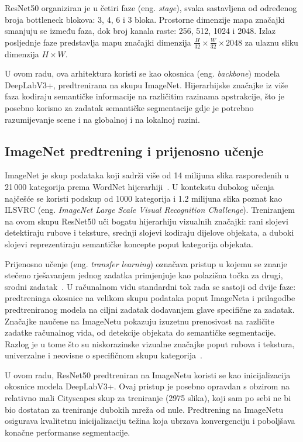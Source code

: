 \documentclass[diplomskirad]{fer}
\begin{document}
ResNet50 organiziran je u četiri faze (eng. \textit{stage}), svaka sastavljena od određenog broja bottleneck blokova: 3, 4, 6 i 3 bloka. Prostorne dimenzije mapa značajki smanjuju se između faza, dok broj kanala raste: 256, 512, 1024 i 2048. Izlaz posljednje faze predstavlja mapu značajki dimenzija $\frac{H}{32} \times \frac{W}{32} \times 2048$ za ulaznu sliku dimenzija $H \times W$.

U ovom radu, ova arhitektura koristi se kao okosnica (eng. \textit{backbone}) modela DeepLabV3+, predtrenirana na skupu ImageNet. Hijerarhijske značajke iz više faza kodiraju semantičke informacije na različitim razinama apstrakcije, što je posebno korisno za zadatak semantičke segmentacije gdje je potrebno razumijevanje scene i na globalnoj i na lokalnoj razini.

\subsection{ImageNet predtrening i prijenosno učenje}
\label{sec:transfer_learning}

ImageNet je skup podataka koji sadrži više od 14 milijuna slika raspoređenih u 21\,000 kategorija prema WordNet hijerarhiji~\cite{deng2009imagenet}. U kontekstu dubokog učenja najčešće se koristi podskup od 1000 kategorija i 1.2 milijuna slika poznat kao ILSVRC (eng. \textit{ImageNet Large Scale Visual Recognition Challenge}). Treniranjem na ovom skupu ResNet50 uči bogatu hijerarhiju vizualnih značajki: rani slojevi detektiraju rubove i teksture, srednji slojevi kodiraju dijelove objekata, a duboki slojevi reprezentiraju semantičke koncepte poput kategorija objekata.

Prijenosno učenje (eng. \textit{transfer learning}) označava pristup u kojemu se znanje stečeno rješavanjem jednog zadatka primjenjuje kao polazišna točka za drugi, srodni zadatak~\cite{goodfellow2016deep}. U računalnom vidu standardni tok rada se sastoji od dvije faze: predtreninga okosnice na velikom skupu podataka poput ImageNeta i prilagodbe predtreniranog modela na ciljni zadatak dodavanjem glave specifične za zadatak. Značajke naučene na ImageNetu pokazuju izuzetnu prenosivost na različite zadatke računalnog vida, od detekcije objekata do semantičke segmentacije. Razlog je u tome što su niskorazinske vizualne značajke poput rubova i tekstura, univerzalne i neovisne o specifičnom skupu kategorija~\cite{yosinski2014transferablefeaturesdeepneural}.

U ovom radu, ResNet50 predtreniran na ImageNetu koristi se kao inicijalizacija okosnice modela DeepLabV3+. Ovaj pristup je posebno opravdan s obzirom na relativno mali Cityscapes skup za treniranje (2975 slika), koji sam po sebi ne bi bio dostatan za treniranje dubokih mreža od nule. Predtrening na ImageNetu osigurava kvalitetnu inicijalizaciju težina koja ubrzava konvergenciju i poboljšava konačne performanse segmentacije.
\end{document}
